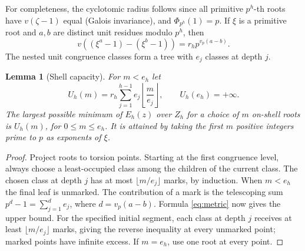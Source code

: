 \documentclass[11pt]{article}
\newtheorem{lemma}[theorem]{Lemma}
\theoremstyle{remark}\newtheorem{remark}[theorem]{Remark}
\begin{document}
For completeness, the cyclotomic radius follows since all primitive $p^h$-th roots have $v(\zeta-1)$ equal (Galois invariance), and $\Phi_{p^h}(1)=p$. If $\xi$ is a primitive root and $a,b$ are distinct unit residues modulo $p^h$, then
\begin{equation}\label{eq:metric}
 v((\xi^a-1)-(\xi^b-1))=r_h p^{v_p(a-b)}.
\end{equation}
The nested unit congruence classes form a tree with $e_j$ classes at depth $j$.

\begin{lemma}[Shell capacity]\label{lem:capacity}
For $m<e_h$ let
\[
 U_h(m)=r_h\sum_{j=1}^{h-1}e_j\left\lfloor\frac m{e_j}\right\rfloor,
 \qquad U_h(e_h)=+\infty.
\]
The largest possible minimum of $E_h(z)$ over $Z_h$ for a choice of $m$ on-shell roots is $U_h(m)$, for $0\le m\le e_h$. It is attained by taking the first $m$ positive integers prime to $p$ as exponents of $\xi$.
\end{lemma}
\begin{proof}
Project roots to torsion points. Starting at the first congruence level, always choose a least-occupied class among the children of the current class. The chosen class at depth $j$ has at most $\lfloor m/e_j\rfloor$ marks, by induction. When $m<e_h$ the final leaf is unmarked. The contribution of a mark is the telescoping sum $p^d-1=\sum_{j=1}^d e_j$, where $d=v_p(a-b)$. Formula \eqref{eq:metric} now gives the upper bound. For the specified initial segment, each class at depth $j$ receives at least $\lfloor m/e_j\rfloor$ marks, giving the reverse inequality at every unmarked point; marked points have infinite excess. If $m=e_h$, use one root at every point.
\end{proof}
\end{document}
